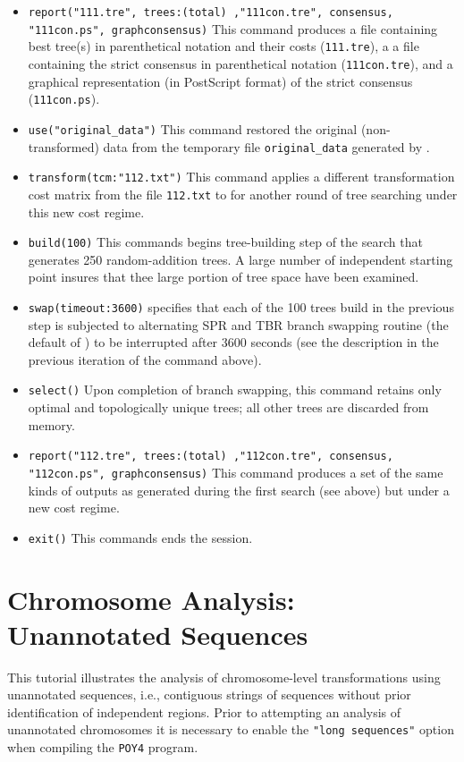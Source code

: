 \begin{itemize}
\item \texttt{report("111.tre", trees:(total) ,"111con.tre", consensus, \\ "111con.ps", graphconsensus)} This command produces a file containing best tree(s) in parenthetical notation and their costs (\texttt{111.tre}), a a file containing the strict consensus in parenthetical notation (\texttt{111con.tre}), and a graphical representation (in PostScript format) of the strict consensus (\texttt{111con.ps}).
\item \texttt{use("original\_data")} This command restored the original (non-transformed) data from the temporary file \texttt{original\_data} generated by .
\item \texttt{transform(tcm:"112.txt")} This command applies a different transformation cost matrix from the file \texttt{112.txt} to for another round of tree searching under this new cost regime.
\item \texttt{build(100)} This commands begins tree-building step of the search that generates 250 random-addition trees. A large number of independent starting point insures that thee large portion of tree space have been examined.
\item \texttt{swap(timeout:3600)}  specifies that each of the 100 trees build in the previous step is subjected to alternating SPR and TBR branch swapping routine (the default of \poy) to be interrupted after 3600 seconds (see the description in the previous iteration of the command above).
\item \texttt{select()} Upon completion of branch swapping, this command retains only optimal and topologically unique trees; all other trees are discarded from memory.
\item \texttt{report("112.tre", trees:(total) ,"112con.tre", consensus, \\ "112con.ps", graphconsensus)} This command produces a set of the same kinds of outputs as generated during the first search (see above) but under a new cost regime.
\item \texttt{exit()} This commands ends the \poy session.
\end{itemize}

\section{Chromosome Analysis: Unannotated Sequences}{\label{tutorial 5}}

This tutorial illustrates the analysis of chromosome-level transformations using 
unannotated sequences, i.e., contiguous strings of sequences without prior 
identification of independent regions. Prior to attempting an analysis of  
unannotated chromosomes it is necessary to enable the \texttt {"long sequences"}
option when compiling the \texttt{POY4} program. 

